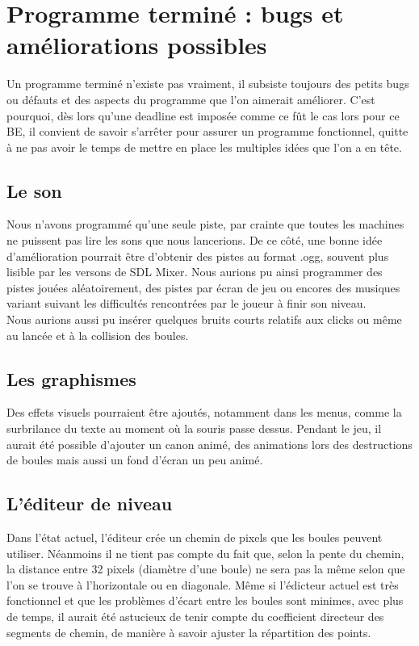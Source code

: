 \section{Programme terminé : bugs et améliorations possibles}

Un programme terminé n'existe pas vraiment, il subsiste toujours des petits bugs ou défauts et des aspects du programme que l'on aimerait améliorer. C'est pourquoi, dès lors qu'une deadline est imposée comme ce fût le cas lors pour ce BE, il convient de savoir s'arrêter pour assurer un programme fonctionnel, quitte à ne pas avoir le temps de mettre en place les multiples idées que l'on a en tête.

\subsection{Le son}

Nous n'avons programmé qu'une seule piste, par crainte que toutes les machines ne puissent pas lire les sons que nous lancerions. De ce côté, une bonne idée d'amélioration pourrait être d'obtenir des pistes au format .ogg, souvent plus lisible par les versons de SDL Mixer. Nous aurions pu ainsi programmer des pistes jouées aléatoirement, des pistes par écran de jeu ou encores des musiques variant suivant les difficultés rencontrées par le joueur à finir son niveau.
\\Nous aurions aussi pu insérer quelques bruits courts relatifs aux clicks ou même au lancée et à la collision des boules.

\subsection{Les graphismes}
Des effets visuels pourraient être ajoutés, notamment dans les menus, comme la surbrilance du texte au moment où la souris passe dessus.
Pendant le jeu, il aurait été possible d'ajouter un canon animé, des animations lors des destructions de boules mais aussi un fond d'écran un peu animé.

\subsection{L'éditeur de niveau}

Dans l'état actuel, l'éditeur crée un chemin de pixels que les boules peuvent utiliser. Néanmoins il ne tient pas compte du fait que, selon la pente du chemin, la distance entre 32 pixels (diamètre d'une boule) ne sera pas la même selon que l'on se trouve à l'horizontale ou en diagonale. Même si l'édicteur actuel est très fonctionnel et que les problèmes d'écart entre les boules sont minimes, avec plus de temps, il aurait été astucieux de tenir compte du coefficient directeur des segments de chemin, de manière à savoir ajuster la répartition des points.

